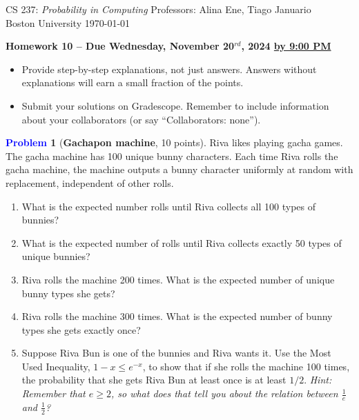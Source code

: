 \documentclass[letterpaper,11pt]{article}
\theoremstyle{plain}%
\theoremstyle{definition}
\newtheorem{problem}{\textcolor{blue}{Problem}}
\theoremstyle{plain}%
\begin{document}
\newcommand{\E}{\mathbb{E}}
\newcommand{\Var}{\mathrm{Var}}

{\noindent\large
CS 237: {\em Probability in Computing} \hfill Professors: Alina Ene, Tiago Januario\\
Boston University \hfill \today\\}
\vspace{1pt} \hrulefill\vspace{3mm}
\begin{center}
{\Large\bf Homework 10 -- Due Wednesday, November 20$^{rd}$, 2024 \underline{by 9:00 PM}}
\end{center}

\begin{itemize}
\item Provide step-by-step explanations, not just answers. Answers without explanations will earn a small fraction of the points.
\item Submit your solutions on Gradescope. Remember to include information about your collaborators (or say ``Collaborators: none'').
\end{itemize}

\begin{problem}[\textbf{Gachapon machine}, 10 points]
Riva likes playing gacha games. The gacha machine has 100 unique bunny characters. Each time Riva rolls the gacha machine, the machine outputs a bunny character uniformly at random with replacement, independent of other rolls.
    \begin{enumerate}[label=(\alph*)]
        \item What is the expected number rolls until Riva collects all 100 types of bunnies?
        \item What is the expected number of rolls until Riva collects exactly 50 types of unique bunnies?
        \item Riva rolls the machine 200 times. What is the expected number of unique bunny types she gets?
        \item Riva rolls the machine 300 times. What is the expected number of bunny types she gets exactly once?
        \item Suppose Riva Bun is one of the bunnies and Riva wants it. Use the Most Used Inequality, $1-x\leq e^{-x}$, to show that if she rolls the machine 100 times, the probability that she gets Riva Bun at least once is at least $1/2$. \textit{Hint: Remember that $e \geq 2$, so what does that tell you about the relation between $\frac 1 e$ and $\frac 1 2$?}
    \end{enumerate}
\end{problem}
\end{document}
